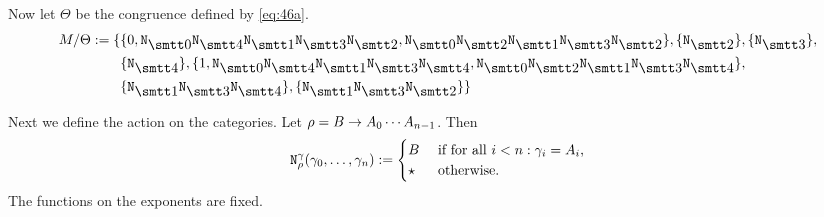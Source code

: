 Now let $\Theta$ be the congruence defined by \eqref{eq:46a}.
\begin{align}
\begin{split}
M/\Theta :=  \{ & \{0, 
\mbox{\tt N}_{\snull}\mbox{\tt N}_{\svier}\mbox{\tt N}_{\seins}%
\mbox{\tt N}_{\sdrei}\mbox{\tt N}_{\szwei},  
\mbox{\tt N}_{\snull}\mbox{\tt N}_{\szwei}\mbox{\tt N}_{\seins}%
\mbox{\tt N}_{\sdrei}\mbox{\tt N}_{\szwei}\},  
\{\mbox{\tt N}_{\szwei}\}, \{\mbox{\tt N}_{\sdrei}\}, 
\\
&
\{\mbox{\tt N}_{\svier}\}, 
\{1, \mbox{\tt N}_{\snull}\mbox{\tt N}_{\svier}\mbox{\tt N}_{\seins}%
\mbox{\tt N}_{\sdrei}\mbox{\tt N}_{\svier}, 
\mbox{\tt N}_{\snull}\mbox{\tt N}_{\szwei}\mbox{\tt N}_{\seins}%
\mbox{\tt N}_{\sdrei}\mbox{\tt N}_{\svier}\}, 
\\ 
&
\{\mbox{\tt N}_{\seins}\mbox{\tt N}_{\sdrei}\mbox{\tt N}_{\svier}\},  
\{\mbox{\tt N}_{\seins}\mbox{\tt N}_{\sdrei}\mbox{\tt N}_{\szwei}\}
\}
\end{split}
\end{align}

Next we define the action on the categories. Let 
$\rho = B \rightarrow A_0\dotsb A_{n-1}$. Then
\begin{equation}
\mbox{\tt N}_{\rho}^{\gamma}(\gamma_0, \dotsc, \gamma_n)
    :=
    \begin{cases}
    B & \text{ if for all $i < n: \gamma_i = A_i$,} \\
        \star & \text{ otherwise.}
    \end{cases}
\end{equation}
The functions on the exponents are fixed. 

